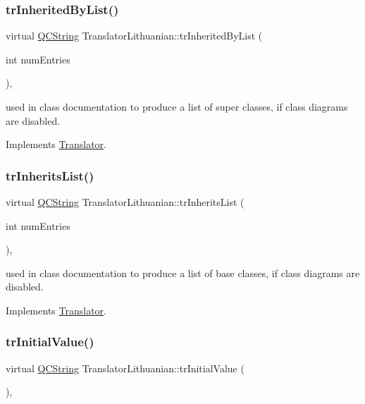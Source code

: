 \subsubsection{\texorpdfstring{trInheritedByList()}{trInheritedByList()}}
{\footnotesize\ttfamily virtual \mbox{\hyperlink{class_q_c_string}{Q\+C\+String}} Translator\+Lithuanian\+::tr\+Inherited\+By\+List (\begin{DoxyParamCaption}\item[{int}]{num\+Entries }\end{DoxyParamCaption})\hspace{0.3cm}{\ttfamily [inline]}, {\ttfamily [virtual]}}

used in class documentation to produce a list of super classes, if class diagrams are disabled. 

Implements \mbox{\hyperlink{class_translator}{Translator}}.

\mbox{\label{class_translator_lithuanian_a925f2e0aaa4a4b651e892dc48d51b841}} 
\subsubsection{\texorpdfstring{trInheritsList()}{trInheritsList()}}
{\footnotesize\ttfamily virtual \mbox{\hyperlink{class_q_c_string}{Q\+C\+String}} Translator\+Lithuanian\+::tr\+Inherits\+List (\begin{DoxyParamCaption}\item[{int}]{num\+Entries }\end{DoxyParamCaption})\hspace{0.3cm}{\ttfamily [inline]}, {\ttfamily [virtual]}}

used in class documentation to produce a list of base classes, if class diagrams are disabled. 

Implements \mbox{\hyperlink{class_translator}{Translator}}.

\mbox{\label{class_translator_lithuanian_a04d4d86b6b9fad8d7918fe0ae07cade8}} 
\subsubsection{\texorpdfstring{trInitialValue()}{trInitialValue()}}
{\footnotesize\ttfamily virtual \mbox{\hyperlink{class_q_c_string}{Q\+C\+String}} Translator\+Lithuanian\+::tr\+Initial\+Value (\begin{DoxyParamCaption}{ }\end{DoxyParamCaption})\hspace{0.3cm}{\ttfamily [inline]}, {\ttfamily [virtual]}}

